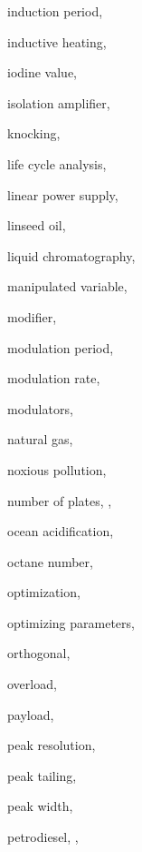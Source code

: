 \begin{theindex}
  \item \lowercase {induction period}, 
  \item \lowercase {inductive heating}, 
  \item \lowercase {iodine value}, 
  \item \lowercase {isolation amplifier}, 
  \item \lowercase {knocking}, 
  \item \lowercase {life cycle analysis}, 
  \item \lowercase {linear power supply}, 
  \item \lowercase {linseed oil}, 
  \item \lowercase {liquid chromatography}, 
  \item \lowercase {manipulated variable}, 
  \item \lowercase {modifier}, 
  \item \lowercase {modulation period}, 
  \item \lowercase {modulation rate}, 
  \item \lowercase {modulators}, 
  \item \lowercase {natural gas}, 
  \item \lowercase {noxious pollution}, 
  \item \lowercase {number of plates}, , 
  \item \lowercase {ocean acidification}, 
  \item \lowercase {octane number}, 
  \item \lowercase {optimization}, 
  \item \lowercase {optimizing parameters}, 
  \item \lowercase {orthogonal}, 
  \item \lowercase {overload}, 
  \item \lowercase {payload}, 
  \item \lowercase {peak resolution}, 
  \item \lowercase {peak tailing}, 
  \item \lowercase {peak width}, 
  \item \lowercase {petrodiesel}, , 

\end{theindex}

